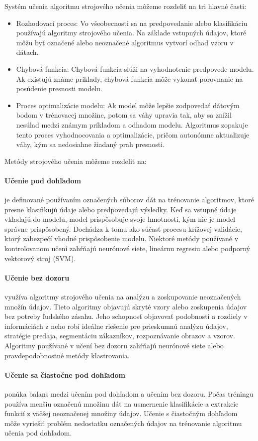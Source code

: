 Systém učenia algoritmu strojového učenia môžeme rozdeliť na tri hlavné časti:
\begin{itemize}
    \item Rozhodovací proces: Vo všeobecnosti sa na predpovedanie alebo klasifikáciu používajú algoritmy strojového učenia. Na základe vstupných údajov, ktoré môžu byť označené alebo neoznačené algoritmus vytvorí odhad vzoru v dátach.
    \item Chybová funkcia: Chybová funkcia slúži na vyhodnotenie predpovede modelu. Ak existujú známe príklady, chybová funkcia môže vykonať porovnanie na posúdenie presnosti modelu.
    \item Proces optimalizácie modelu: Ak model môže lepšie zodpovedať dátovým bodom v trénovacej množine, potom sa váhy upravia tak, aby sa znížil nesúlad medzi známym príkladom a odhadom modelu. Algoritmus zopakuje tento proces vyhodnocovania a optimalizácie, pričom autonómne aktualizuje váhy, kým sa nedosiahne žiadaný prah presnosti.
\end{itemize}

Metódy strojového učenia môžeme rozdeliť na:
\paragraph{Učenie pod dohľadom} je definované používaním označených súborov dát na trénovanie algoritmov, ktoré presne klasifikujú údaje alebo predpovedajú výsledky. Keď sa vstupné údaje vkladajú do modelu, model prispôsobuje svoje hmotnosti, kým nie je model správne prispôsobený. Dochádza k tomu ako súčasť procesu krížovej validácie, ktorý zabezpečí vhodné prispôsobenie modelu. Niektoré metódy používané v kontrolovanom učení zahŕňajú neurónové siete, lineárnu regresiu alebo podporný vektorový stroj (SVM).

\paragraph{Učenie bez dozoru} využíva algoritmy strojového učenia na analýzu a zoskupovanie neoznačených množín údajov. Tieto algoritmy objavujú skryté vzory alebo zoskupenia údajov bez potreby ľudského zásahu. Jeho schopnosť objavovať podobnosti a rozdiely v informáciách z neho robí ideálne riešenie pre prieskumnú analýzu údajov, stratégie predaja, segmentáciu zákazníkov, rozpoznávanie obrazov a vzorov. Algoritmy používané v učení bez dozoru zahŕňajú neurónové siete alebo pravdepodobnostné metódy klastrovania.

\paragraph{Učenie sa čiastočne pod dohľadom} ponúka balans medzi učením pod dohľadom a učením bez dozoru. Počas tréningu používa menšiu označenú množinu dát na usmernenie klasifikácie a extrakcie funkcií z väčšej neoznačenej množiny údajov. Učenie s čiastočným dohľadom môže vyriešiť problém nedostatku označených údajov na trénovanie algoritmu učenia pod dohľadom.

